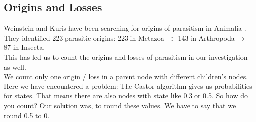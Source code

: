     \subsection{Origins and Losses}

      Weinstein and Kuris have been searching for origins of parasitism in Animalia \cite{Weinstein2016}. 
        They identified 223 parasitic origins: 223 in Metazoa $\supset$ 143 in Arthropoda $\supset$ 87 
        in Insecta. \\
      This has led us to count the origins and losses of parasitism in our investigation as well. \\
      We count only one origin / loss in a parent node with different children's nodes. \\
      Here we have encountered a problem: The Castor algorithm gives us probabilities for states. That 
        means there are also nodes with state like 0.3 or 0.5. So how do you count? Our solution was, 
        to round these values. We have to say that we round 0.5 to 0.

